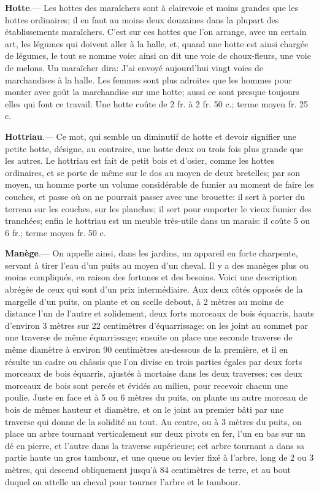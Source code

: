 \documentclass[10pt,a4paper]{book}
\begin{document}
\textbf{Hotte}.--- Les hottes des maraîchers sont à clairevoie et moins grandes que les hottes ordinaires; il en faut au moins deux douzaines dans la plupart des établissements maraîchers. C'est sur ces hottes que l'on arrange, avec un certain art, les légumes qui doivent aller à la halle, et, quand une hotte est ainsi chargée de légumes, le tout se nomme voie: ainsi on dit une voie de choux-fleurs, une voie de melons. Un maraîcher dira: J'ai envoyé aujourd'hui vingt voies de marchandises à la halle. Les femmes sont plus adroites que les hommes pour monter avec goût la marchandise sur une hotte; aussi ce sont presque toujours elles qui font ce travail. Une hotte coûte de 2 fr. à 2 fr. 50 c.; terme moyen  fr. 25 c.

\textbf{Hottriau}.--- Ce mot, qui semble un diminutif de hotte et devoir signifier une petite hotte, désigne, au contraire, une hotte deux ou trois fois plus grande que les autres. Le hottriau est fait de petit bois et d'osier, comme les hottes ordinaires, et se porte de même sur le dos au moyen de deux bretelles; par son moyen, un homme porte un volume considérable de fumier au moment de faire les couches, et passe où on ne pourrait passer avec une brouette: il sert à porter du terreau sur les couches, sur les planches; il sert pour emporter le vieux fumier des tranchées; enfin le hottriau est un meuble très-utile dans un marais: il coûte 5 ou 6 fr.; terme moyen  fr. 50 c.

\textbf{Manège}.--- On appelle ainsi, dans les jardins, un appareil en forte charpente, servant à tirer l'eau d'un puits au moyen d'un cheval. Il y a des manèges plus ou moins compliqués, en raison des fortunes et des besoins. Voici une description abrégée de ceux qui sont d'un prix intermédiaire. Aux deux côtés opposés de la margelle d'un puits, on plante et on scelle debout, à 2 mètres au moins de distance l'un de l'autre et solidement, deux forts morceaux de bois équarris, hauts d'environ 3 mètres sur 22 centimètres d'équarrissage: on les joint au sommet par une traverse de même équarrissage; ensuite on place une seconde traverse de même diamètre à environ 90 centimètres au-dessous de la première, et il en résulte un cadre ou châssis que l'on divise en trois parties égales par deux forts morceaux de bois équarris, ajustés à mortaise dans les deux traverses: ces deux morceaux de bois sont percés et évidés au milieu, pour recevoir chacun une poulie. Juste en face et à 5 ou 6 mètres du puits, on plante un autre morceau de bois de mêmes hauteur et diamètre, et on le joint au premier bâti par une traverse qui donne de la solidité au tout. Au centre, ou à 3 mètres du puits, on place un arbre tournant verticalement sur deux pivots en fer, l'un en bas sur un dé en pierre, et l'autre dans la traverse supérieure; cet arbre tournant a dans sa partie haute un gros tambour, et une queue ou levier fixé à l'arbre, long de 2 ou 3 mètres, qui descend obliquement jusqu'à 84 centimètres de terre, et au bout duquel on attelle un cheval pour tourner l'arbre et le tambour.
\end{document}
